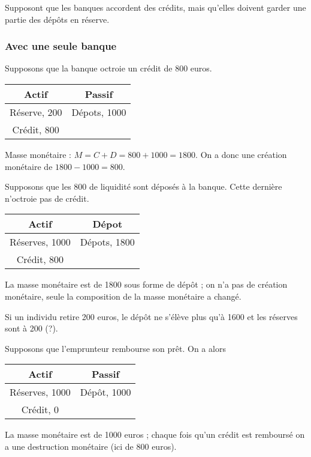 	Supposont que les banques accordent des crédits, mais qu'elles doivent garder une partie des dépôts en réserve.
	
	\subsubsection{Avec une seule banque}
	
	Supposons que la banque octroie un crédit de 800 euros.
	
\begin{center}
	\begin{tabular}{c|c}
	Actif & Passif \\ 
	\hline 
	Réserve, 200 & Dépots, 1000 \\ 
	Crédit, 800 & 
	\end{tabular} 
\end{center}
	
	Masse monétaire : $M = C + D = 800+  1000 = 1800$. On a donc une création monétaire de $1800 - 1000 = 800$.
	
	Supposons que les 800 de liquidité sont déposés à la banque. Cette dernière n'octroie pas de crédit.
		
\begin{center}
 		\begin{tabular}{c|c}
		Actif & Dépot \\ 
		\hline 
		Réserves, 1000 & Dépots, 1800 \\ 
		Crédit, 800 &  
		\end{tabular}
 \end{center} 
		
	La masse monétaire est de 1800 sous forme de dépôt ; on n'a pas de création monétaire, seule la composition de la masse monétaire a changé.
		
	Si un individu retire 200 euros, le dépôt ne s'élève plus qu'à 1600 et les réserves sont à 200 (?).
		
	Supposons que l'emprunteur rembourse son prêt. On a alors
		
\begin{center}
		\begin{tabular}{c|c}
		Actif & Passif \\ 
		\hline 
		Réserves, 1000 & Dépôt, 1000 \\ 
		Crédit, 0 & 
		\end{tabular}
\end{center}
		
		La masse monétaire est de 1000 euros ; chaque fois qu'un crédit est remboursé on a une destruction monétaire (ici de 800 euros).
	

